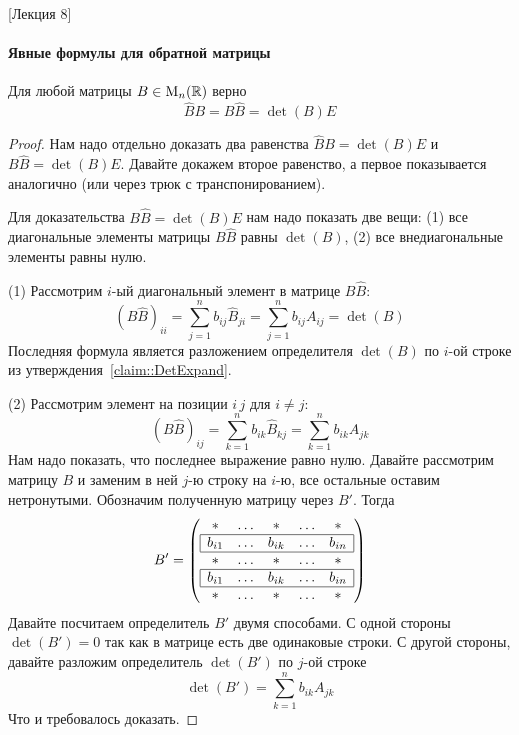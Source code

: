 [Лекция 8]


\paragraph{Явные формулы для обратной матрицы}

\begin{claim}
\label{claim::InvMatExplicite}
Для любой матрицы $B\in \operatorname{M}_{n}(\mathbb R)$ верно 
\[
\hat B B = B\hat B = \det(B) E
\]
\end{claim}
\begin{proof}
Нам надо отдельно доказать два равенства $\hat B B = \det (B) E$ и $B\hat B = \det (B) E$.
Давайте докажем второе равенство, а первое показывается аналогично (или через трюк с транспонированием).

Для доказательства $B\hat B = \det (B) E$ нам надо показать две вещи:
(1) все диагональные элементы матрицы $B\hat B$ равны $\det (B)$, (2) все внедиагональные элементы равны нулю.

(1) Рассмотрим $i$-ый диагональный элемент в матрице $B\hat B$:
\[
(B\hat B)_{ii} = \sum_{j=1}^n b_{ij}\hat B_{ji} = \sum_{j=1}^n b_{ij}A_{ij}=\det(B)
\]
Последняя формула является разложением определителя $\det (B)$ по $i$-ой строке из утверждения~\ref{claim::DetExpand}.

(2) Рассмотрим элемент на позиции $i\,j$ для $i\neq j$:
\[
(B\hat B)_{ij} = \sum_{k=1}^n b_{ik}\hat B_{kj} = \sum_{k=1}^n b_{ik}A_{jk}
\]
Нам надо показать, что последнее выражение равно нулю.
Давайте рассмотрим матрицу $B$ и заменим в ней $j$-ю строку на $i$-ю, все остальные оставим нетронутыми.
Обозначим полученную матрицу через $B'$.
Тогда
\[
B' =
\left(
\begin{array}{ccccc}
{*}&{\ldots}&{*}&{\ldots}&{*}\\
\hline
\multicolumn{1}{|c}{b_{i1}}&{\ldots}&{b_{ik}}&{\ldots}&\multicolumn{1}{c|}{b_{in}}\\
\hline
{*}&{\ldots}&{*}&{\ldots}&{*}\\
\hline
\multicolumn{1}{|c}{b_{i1}}&{\ldots}&{b_{ik}}&{\ldots}&\multicolumn{1}{c|}{b_{in}}\\
\hline
{*}&{\ldots}&{*}&{\ldots}&{*}\\
\end{array}
\right)
\]
Давайте посчитаем определитель $B'$ двумя способами.
С одной стороны $\det(B') = 0$ так как в матрице есть две одинаковые строки.
С другой стороны, давайте разложим определитель $\det(B')$ по $j$-ой строке
\[
\det (B') = \sum_{k=1}^n b_{ik}A_{jk}
\]
Что и требовалось доказать.
\end{proof}

